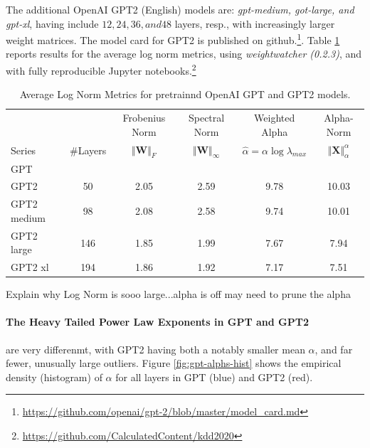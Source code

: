 The additional OpenAI GPT2 (English) models are: \emph{gpt-medium, got-large, and gpt-xl}, 
having include $12, 24, 36, and 48$ layers, resp., with increasingly larger weight matrices.
The model card for GPT2 is published on github.\footnote{\url{https://github.com/openai/gpt-2/blob/master/model_card.md}}.
Table \ref{table:nlp} reports results for the average log norm metrics, using \emph{weightwatcher (0.2.3)},
and with fully reproducible Jupyter notebooks.\footnote{\url{https://github.com/CalculatedContent/kdd2020}}


\begin{table}[t]
\small
\begin{center}
\begin{tabular}{|p{1in}|c|c|c|c|c|}
\hline
   &    & Frobenius Norm & Spectral Norm & Weighted Alpha & Alpha-Norm \\
 Series & \#Layers   & $\Vert\mathbf{W}\Vert_{F}$ & $\Vert\mathbf{W}\Vert_{\infty}$ & $\hat{\alpha}=\alpha\log\lambda_{max}$ & $\Vert\mathbf{X}\Vert^{\alpha}_{\alpha}$ \\
\hline
 GPT & & & & &\\
GPT2 & 50 & 2.05 &2.59& 9.78 & 10.03 \\
GPT2 medium & 98 & 2.08 &2.58& 9.74 & 10.01 \\
GPT2 large & 146 & 1.85 &1.99& 7.67 & 7.94 \\
GPT2 xl & 194 & 1.86 &1.92& 7.17 & 7.51 \\
\hline
\end{tabular}
\end{center}
\caption{Average Log Norm Metrics for pretrainnd OpenAI GPT and GPT2 models.}
\label{table:nlp}
\end{table}

Explain why Log Norm is sooo large...alpha is off may need to prune the alpha

\paragraph{The Heavy Tailed Power Law Exponents in GPT and GPT2}

are very differenmt, with GPT2 having both a notably smaller mean $\alpha$, and far fewer, unusually large outliers.
Figure \ref{fig:gpt-alphs-hist} shows the empirical density (histogram) of $\alpha$
for all layers in GPT (blue) and GPT2 (red).  

